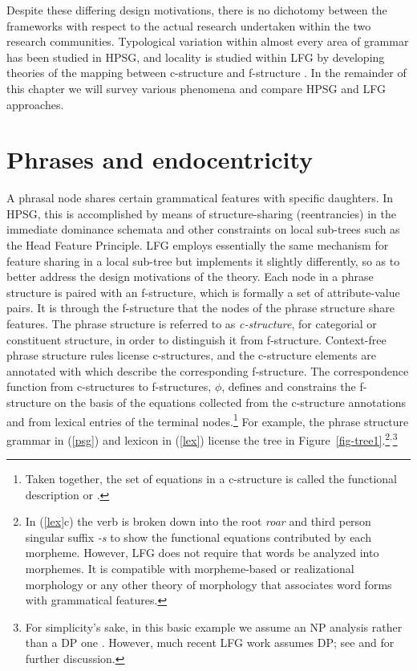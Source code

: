 Despite these differing design motivations, there is no dichotomy between the frameworks with respect to the actual research undertaken within the two research communities.  Typological variation within almost every area of grammar has been studied in HPSG, and locality is studied within LFG by developing theories of the mapping between c-structure and f-structure  \citep[see][88--128]{BATW2016a}.   In the remainder of this chapter we will survey various phenomena and compare HPSG and LFG approaches.


\section{Phrases and endocentricity} 

\largerpage[2]
A phrasal node shares certain grammatical features with specific daughters. %
In HPSG, this is accomplished
by means of structure-sharing (reentrancies) in the immediate dominance schemata and other 
constraints on local sub-trees such as the Head Feature Principle.  LFG employs essentially the same mechanism for feature sharing in a local sub-tree but implements it slightly differently, so as to better address the design motivations of the theory.  Each node in a phrase structure is paired with an f-structure, which is formally a set of attribute-value pairs.  It is through the f-structure that the nodes of the phrase structure share features.   The phrase structure is referred to as \textit{c-structure}, for categorial or constituent structure, in order to distinguish it from f-structure. 
Context-free phrase structure rules  license c-structures, and the c-structure elements are annotated with  which describe the corresponding f-structure.  
The correspondence function from c-structures to f-structures, $\phi$, defines and constrains the f-structure on the basis of the  equations collected from the c-structure annotations and from lexical entries of the terminal nodes.\footnote{Taken together, the set of equations in a c-structure is called the functional description or .}  For example, the phrase structure grammar in (\ref{psg}) and lexicon in (\ref{lex}) license the tree in Figure~\ref{fig-tree1}.\footnote{In (\ref{lex}c) the verb is broken down into the root \textit{roar} and third person singular suffix \textit{-s} to show the functional equations contributed by each morpheme.  However, LFG does not require that words be analyzed into morphemes.  It is compatible with morpheme-based \citep[e.g.,][384--385, 395--396]{ishikawa85,BATW2016a} or realizational morphology   \citep[Chapter 12]{dalrymple;ea19} or any other theory of morphology that associates word forms with grammatical features.}$^,$\footnote{For simplicity's sake, in this basic example we assume an NP analysis rather than a DP one \citep{Brame82a}. However, much recent LFG work assumes DP; see \citet{BATW2016a} and \citet{dalrymple;ea19} for further discussion.}

